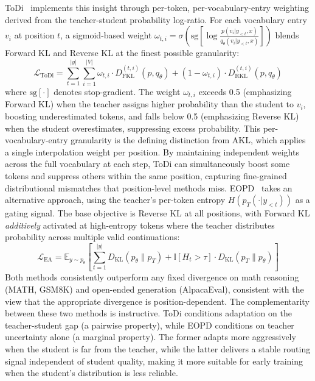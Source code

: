 \documentclass{article} %
\newcommand{\E}{\mathbb{E}}
\newcommand{\KL}{D_{\mathrm{KL}}}
\newcommand{\ptheta}{p_\theta}
\newcommand{\pteacher}{p_T}
\newcommand{\loss}{\mathcal{L}}
\begin{document}
ToDi~\citep{2505.16297} implements this insight through per-token, per-vocabulary-entry weighting derived from the teacher-student probability log-ratio. For each vocabulary entry $v_i$ at position $t$, a sigmoid-based weight $\omega_{t,i} = \sigma\!\left(\mathrm{sg}\!\left[\log \frac{p(v_i|y_{<t},x)}{q_\theta(v_i|y_{<t},x)}\right]\right)$ blends Forward KL and Reverse KL at the finest possible granularity:
\begin{equation}
    \loss_{\text{ToDi}} = \sum_{t=1}^{|y|} \sum_{i=1}^{|V|} \omega_{t,i} \cdot D_{\text{FKL}}^{(t,i)}(p, q_\theta) + (1 - \omega_{t,i}) \cdot D_{\text{RKL}}^{(t,i)}(p, q_\theta)
\end{equation}
where $\mathrm{sg}[\cdot]$ denotes stop-gradient. The weight $\omega_{t,i}$ exceeds 0.5 (emphasizing Forward KL) when the teacher assigns higher probability than the student to $v_i$, boosting underestimated tokens, and falls below 0.5 (emphasizing Reverse KL) when the student overestimates, suppressing excess probability. This per-vocabulary-entry granularity is the defining distinction from AKL, which applies a single interpolation weight per position. By maintaining independent weights across the full vocabulary at each step, ToDi can simultaneously boost some tokens and suppress others within the same position, capturing fine-grained distributional mismatches that position-level methods miss. EOPD~\citep{2603.07079} takes an alternative approach, using the teacher's per-token entropy $H(\pteacher(\cdot|y_{<t}))$ as a gating signal. The base objective is Reverse KL at all positions, with Forward KL \emph{additively} activated at high-entropy tokens where the teacher distributes probability across multiple valid continuations:
\begin{equation}
    \loss_{\text{EA}} = \E_{y \sim \ptheta} \left[ \sum_{t=1}^{|y|} \KL(\ptheta \parallel \pteacher) + \mathbb{I}[H_t > \tau] \cdot \KL(\pteacher \parallel \ptheta) \right]
\end{equation}
Both methods consistently outperform any fixed divergence on math reasoning (MATH, GSM8K) and open-ended generation (AlpacaEval), consistent with the view that the appropriate divergence is position-dependent. The complementarity between these two methods is instructive. ToDi conditions adaptation on the teacher-student gap (a pairwise property), while EOPD conditions on teacher uncertainty alone (a marginal property). The former adapts more aggressively when the student is far from the teacher, while the latter delivers a stable routing signal independent of student quality, making it more suitable for early training when the student's distribution is less reliable.
\end{document}
